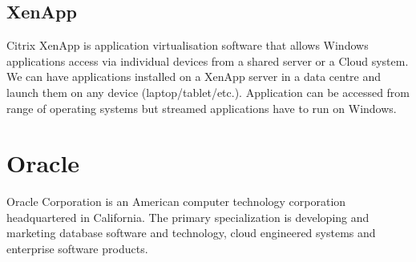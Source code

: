 \begin{enumerate}
\subsection{XenApp}
Citrix XenApp is application virtualisation software that allows Windows applications access via individual devices from a shared server or a Cloud system. We can have applications installed on a XenApp server in a data centre and launch them on any device (laptop/tablet/etc.). Application can be accessed from range of operating systems but streamed applications have to run on Windows.


\section{Oracle}
Oracle Corporation is an American computer technology corporation headquartered in California. The primary specialization is developing and marketing database software and technology, cloud engineered systems and enterprise software products.


\end{enumerate}
